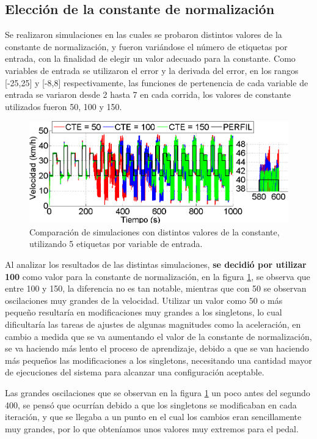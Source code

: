 \subsection{Elección de la constante de normalización}


Se realizaron simulaciones en las cuales se probaron distintos valores de la constante de normalización, y fueron variándose el número de etiquetas por entrada, con la finalidad de elegir un valor adecuado para la constante. Como variables de entrada se utilizaron el error y la derivada del error, en los rangos [-25,25] y [-8,8] respectivamente, las funciones de pertenencia de cada variable de entrada se variaron desde 2 hasta 7 en cada corrida, los valores de constante utilizados fueron 50, 100 y 150. 

\begin{figure}[htb]
\centering
\includegraphics[width=0.6\linewidth,type=png,ext=.png,read=.png]{figures/tresC}
\caption{Comparación de simulaciones con distintos valores de la constante, utilizando 5 etiquetas por variable de entrada.}
\label{fig:tresC}
\end{figure} 



Al analizar los resultados de las distintas simulaciones, \textbf{se decidió por utilizar 100} como valor para la constante de normalización, en la figura \ref{fig:tresC}, se observa que entre 100 y 150, la diferencia no es tan notable, mientras que con 50 se observan oscilaciones muy grandes de la velocidad. Utilizar un valor como 50 o más pequeño resultaría en modificaciones muy grandes a los singletons, lo cual dificultaría las tareas de ajustes de algunas magnitudes como la aceleración, en cambio a medida que se va aumentando el valor de la constante de normalización, se va haciendo más lento el proceso de aprendizaje, debido a que se van haciendo más pequeños las modificaciones a los singletons, necesitando una cantidad mayor de ejecuciones del sistema para alcanzar una configuración aceptable.

Las grandes oscilaciones que se observan en la figura \ref{fig:tresC} un poco antes del segundo 400, se pensó que ocurrían debido a que los singletons se modificaban en cada iteración, y que se llegaba a un punto en el cual los cambios eran sencillamente muy grandes, por lo que obteníamos unos valores muy extremos para el pedal.


